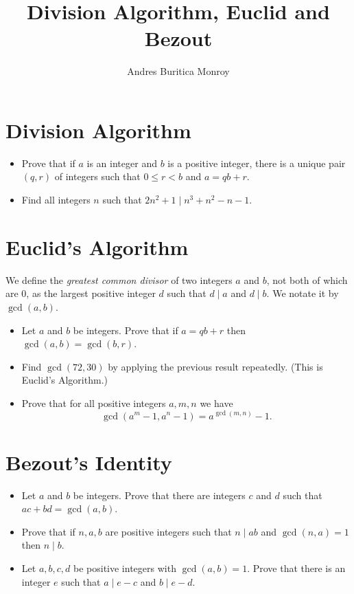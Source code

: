 \documentclass{article}
\title{Division Algorithm, Euclid and Bezout}
\author{Andres Buritica Monroy}
\date{}
\begin{document}
\maketitle
\section{Division Algorithm}
  \begin{itemize}
    \item Prove that if $a$ is an integer and $b$ is a positive integer, there
      is a unique pair $(q,r)$ of integers such that $0\le r<b$ and $a=qb+r$.
    \item Find all integers $n$ such that $2n^2+1\mid n^3+n^2-n-1$.
  \end{itemize}
\section{Euclid's Algorithm}
  We define the \emph{greatest common divisor} of two integers $a$ and $b$, not
  both of which are 0, as the largest positive integer $d$ such that $d\mid a$
  and $d\mid b$. We notate it by $\gcd(a,b)$.
  \begin{itemize}
    \item Let $a$ and $b$ be integers. Prove that if $a=qb+r$ then
      $\gcd(a,b)=\gcd(b,r)$.
    \item Find $\gcd(72,30)$ by applying the previous result repeatedly. (This
      is Euclid's Algorithm.)
    \item Prove that for all positive integers $a,m,n$ we have
      \[\gcd(a^m-1,a^n-1)=a^{\gcd(m,n)}-1.\]
  \end{itemize}
\section{Bezout's Identity}
  \begin{itemize}
    \item Let $a$ and $b$ be integers. Prove that there are integers $c$ and $d$
      such that $ac+bd=\gcd(a,b)$.
    \item Prove that if $n,a,b$ are positive integers such that $n\mid ab$ and
      $\gcd(n,a)=1$ then $n\mid b$.
    \item Let $a,b,c,d$ be positive integers with $\gcd(a,b)=1$. Prove that there is an integer $e$
      such that $a\mid e-c$ and $b\mid e-d$.
  \end{itemize}
\newpage
\end{document}
